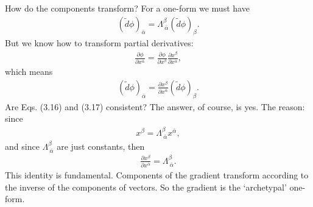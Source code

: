 \documentclass[11pt,letterpaper]{book}
\begin{document}
    How do the components transform? For a one-form we must have
    \begin{align}
    (\tilde{d}\phi)_{\bar{\alpha}} = \Lambda^\beta_{\ \bar{\alpha}} (\tilde{d}\phi)_\beta. \tag{3.16}
    \end{align}
    But we know how to transform partial derivatives:
    \begin{align}
    \frac{\partial \phi}{\partial x^{\bar{\alpha}}} = \frac{\partial \phi}{\partial x^\beta} \frac{\partial x^\beta}{\partial x^{\bar{\alpha}}},
    \end{align}
    which means
    \begin{align}
    (\tilde{d}\phi)_{\bar{\alpha}} = \frac{\partial x^\beta}{\partial x^{\bar{\alpha}}} (\tilde{d}\phi)_\beta. \tag{3.17}
    \end{align}
    Are Eqs. (3.16) and (3.17) consistent? The answer, of course, is yes. The reason: since
    \begin{align}
    x^\beta = \Lambda^\beta_{\ \bar{\alpha}} x^{\bar{\alpha}},
    \end{align}
    and since \(\Lambda^\beta_{\ \bar{\alpha}}\) are just constants, then
    \begin{align}
    \frac{\partial x^\beta}{\partial x^{\bar{\alpha}}} = \Lambda^\beta_{\ \bar{\alpha}}. \tag{3.18}
    \end{align}
    This identity is fundamental. Components of the gradient transform according to the inverse of the components of vectors. So the gradient is the ‘archetypal’ one-form.
\end{document}
